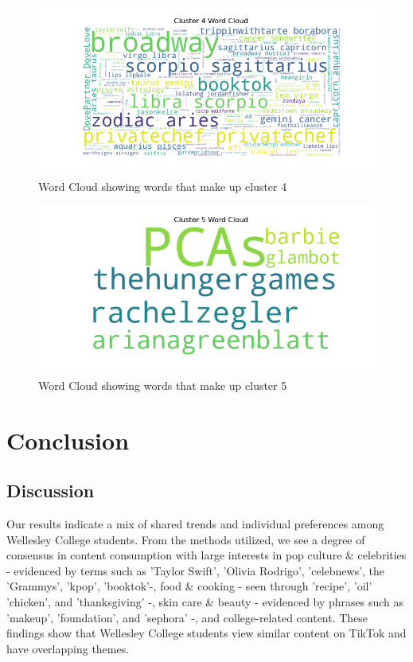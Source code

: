 \documentclass[acmtog]{acmart}
\begin{document}
\begin{figure}[ht]
  \includegraphics[width=0.8\linewidth]{cluster_4_wordcloud.png} 
  \caption{Word Cloud showing words that make up cluster 4}
  \label{fig:WordsInCluster4}
\end{figure}

\begin{figure}[ht]
  \includegraphics[width=0.8\linewidth]{cluster_5_wordcloud.png} 
  \caption{Word Cloud showing words that make up cluster 5}
  \label{fig:WordsInCluster5}
\end{figure}

\section{Conclusion}
\subsection{Discussion}
Our results indicate a mix of shared trends and individual preferences among Wellesley College students. From the methods utilized, we see a degree of consensus in content consumption with large interests in pop culture \& celebrities - evidenced by terms such as 'Taylor Swift', 'Olivia Rodrigo', 'celebnews', the 'Grammys', 'kpop', 'booktok'-, food \& cooking - seen through 'recipe', 'oil' 'chicken', and 'thanksgiving' -, skin care \& beauty - evidenced by phrases such as 'makeup', 'foundation', and 'sephora' -, and college-related content. These findings show that Wellesley College students view similar content on TikTok and have overlapping themes.
\end{document}
